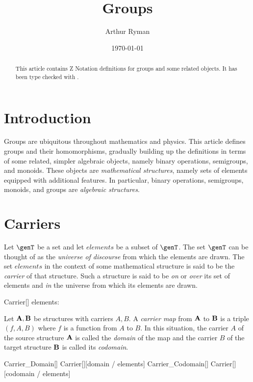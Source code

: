 \documentclass{amsart}
\begin{document}
\title{Groups}
\author{Arthur Ryman}
\date{\today}

\begin{abstract}
This article contains Z Notation definitions for groups and some related objects.
It has been type checked with \fuzz.
\end{abstract}

\maketitle

\tableofcontents

\section{Introduction}

Groups are ubiquitous throughout mathematics and physics.
This article defines groups and their homomorphisms,
gradually building up the definitions in terms of some related, simpler algebraic objects,
namely binary operations, semigroups, and monoids.
These objects are \textit{mathematical structures}, namely sets of elements equipped with additional features.
In particular, binary operations, semigroups, monoids, and groups are \textit{algebraic structures}. 

\section{Carriers}

Let $\genT$ be a set and let $elements$ be a subset of $\genT$.
The set $\genT$ can be thought of as the \textit{universe of discourse} from which the elements are drawn.
The set $elements$ in the context of some mathematical structure is said to be the \textit{carrier} of that structure.
Such a structure is said to be \textit{on} or \textit{over} its set of elements
and \textit{in} the universe from which its elements are drawn.
\begin{schema}{Carrier}[\genT]
	elements: \power \genT
\end{schema}

Let $\mathbf{A}, \mathbf{B}$ be structures with carriers $A, B$.
A \textit{carrier map} from $\mathbf{A}$ to $\mathbf{B}$ is a triple $(f, A, B)$ where $f$ is a function from $A$ to $B$.
In this situation, the carrier $A$ of the source structure $\mathbf{A}$ is called the \textit{domain} of the map 
and the carrier $B$ of the target structure $\mathbf{B}$ is called its \textit{codomain}.
\begin{zed}
	Carrier\_Domain[\genT]  Carrier[\genT][domain / elements]
\also
	Carrier\_Codomain[\genT]  Carrier[\genT][codomain / elements]
\end{zed}
\end{document}

